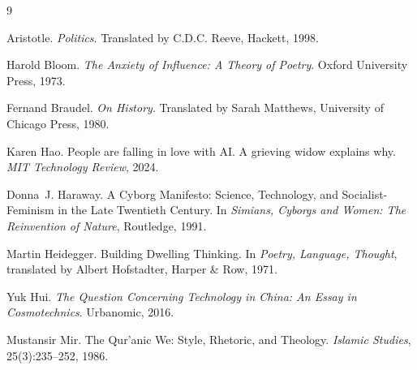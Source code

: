 \documentclass[12pt,a4paper]{article}
\begin{document}

\begin{thebibliography}{9}

Aristotle.
\newblock \emph{Politics}.
\newblock Translated by C.D.C. Reeve, Hackett, 1998.

Harold Bloom.
\newblock \emph{The Anxiety of Influence: A Theory of Poetry}.
\newblock Oxford University Press, 1973.

Fernand Braudel.
\newblock \emph{On History}.
\newblock Translated by Sarah Matthews, University of Chicago Press, 1980.

Karen Hao.
\newblock People are falling in love with AI\@. A grieving widow explains why.
\newblock \emph{MIT Technology Review}, 2024.

Donna~J. Haraway.
\newblock A Cyborg Manifesto: Science, Technology, and Socialist-Feminism in the Late Twentieth Century.
\newblock In \emph{Simians, Cyborgs and Women: The Reinvention of Nature}, Routledge, 1991.

Martin Heidegger.
\newblock Building Dwelling Thinking.
\newblock In \emph{Poetry, Language, Thought}, translated by Albert Hofstadter, Harper \& Row, 1971.

Yuk Hui.
\newblock \emph{The Question Concerning Technology in China: An Essay in Cosmotechnics}.
\newblock Urbanomic, 2016.

Mustansir Mir.
\newblock The Qur'anic We: Style, Rhetoric, and Theology.
\newblock \emph{Islamic Studies}, 25(3):235--252, 1986.

\end{thebibliography}
\end{document}

